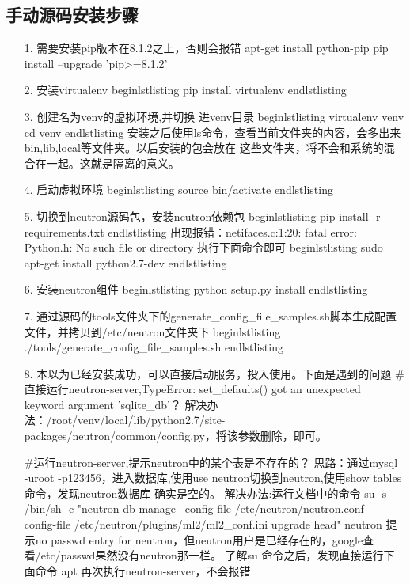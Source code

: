 \documentclass[a4paper,left=1.5cm,right=1.5cm,11pt]{article}
\begin{document}
\subsection{手动源码安装步骤}
    \begin{itemize}
		\item[1.]需要安装pip版本在8.1.2之上，否则会报错
			apt-get install python-pip
			pip install --upgrade 'pip>=8.1.2'
		\item[2.]安装virtualenv
			begin{lstlisting}
				pip install virtualenv
			end{lstlisting}
		\item[3.]创建名为venv的虚拟环境,并切换	进venv目录
			begin{lstlisting}
				virtualenv venv
				cd venv
			end{lstlisting}
			安装之后使用ls命令，查看当前文件夹的内容，会多出来bin,lib,local等文件夹。以后安装的包会放在
			这些文件夹，将不会和系统的混合在一起。这就是隔离的意义。
		\item[4.]启动虚拟环境
			begin{lstlisting}
				source bin/activate
			end{lstlisting}
        \item[5.]切换到neutron源码包，安装neutron依赖包
			begin{lstlisting}
				pip install -r requirements.txt
			end{lstlisting}
			出现报错：netifaces.c:1:20: fatal error: Python.h: No such file or directory
			执行下面命令即可
			begin{lstlisting}
				sudo apt-get install python2.7-dev
			end{lstlisting}
		\item[6.]安装neutron组件
			begin{lstlisting}
				python setup.py install
			end{lstlisting}
		\item[7.]通过源码的tools文件夹下的generate\_config\_file\_samples.sh脚本生成配置文件，并拷贝到/etc/neutron文件夹下
			begin{lstlisting}
				./tools/generate_config_file_samples.sh
			end{lstlisting}	
		\item[8.]本以为已经安装成功，可以直接启动服务，投入使用。下面是遇到的问题
			#直接运行neutron-server,TypeError: set\_defaults() got an unexpected keyword argument 'sqlite_db'？
			解决办法：/root/venv/local/lib/python2.7/site-packages/neutron/common/config.py，将该参数删除，即可。

			#运行neutron-server,提示neutron中的某个表是不存在的？
			思路：通过mysql -uroot -p123456，进入数据库,使用use neutron切换到neutron,使用show tables命令，发现neutron数据库
			确实是空的。
			解决办法:运行文档中的命令
			su -s /bin/sh -c "neutron-db-manage --config-file /etc/neutron/neutron.conf \
			--config-file /etc/neutron/plugins/ml2/ml2\_conf.ini upgrade head" neutron
			提示no passwd entry for neutron，但neutron用户是已经存在的，google查看/etc/passwd果然没有neutron那一栏。
			了解su 命令之后，发现直接运行下面命令
			apt
			再次执行neutron-server，不会报错


\end{itemize}
\end{document}
